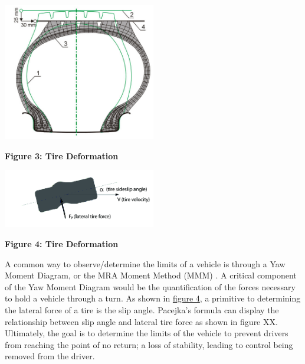 \documentclass[12pt]{article}
\begin{document}
        \begin{center}
            \vspace{0.5cm}

            \includegraphics[width=0.5\textwidth]{resources/applsci-10-04326-g009-550.jpg}

            \vspace{0.5cm}

            \textbf{Figure 3: Tire Deformation} \autocite{app10124326}
            \label{tire_deformation_1}
        
        \end{center}

        \begin{center}
            \vspace{0.5cm}

            \includegraphics[width=0.5\textwidth]{resources/Lateral-tire-deformation.png}

            \vspace{0.5cm}

            \textbf{Figure 4: Tire Deformation} \autocite{inproceedings}
            \label{tire_deformation_2}
        
        \end{center}

        A common way to observe/determine the limits of a vehicle is through a Yaw Moment Diagram, or the MRA Moment Method 
        (MMM) \autocite{Milliken_Research_Associates}. A critical component of the Yaw Moment Diagram would be the quantification of the forces necessary to hold 
        a vehicle through a turn. As shown in  \hyperref[tire_deformation_2]{figure 4}, a primitive to determining the lateral force of a tire is the slip angle. 
        Pacejka’s formula can display the relationship between slip angle and lateral tire force as shown in figure XX. Ultimately, 
        the goal is to determine the limits of the vehicle to prevent drivers from reaching the point of no return; a loss of 
        stability, leading to control being removed from the driver.
\end{document}
